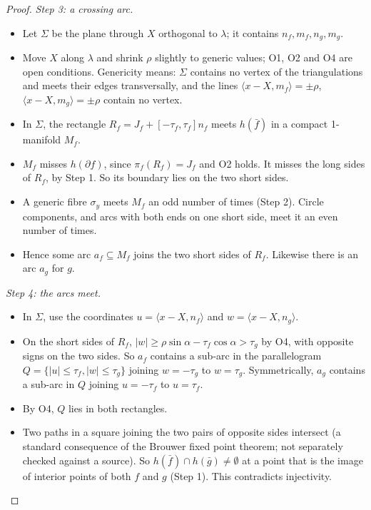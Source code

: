 \documentclass[preprint,12pt]{elsarticle}
\theoremstyle{definition}
\theoremstyle{remark}
\begin{document}
\begin{proof}
\emph{Step 3: a crossing arc.}
\begin{itemize}
\item Let $\Sigma$ be the plane through $X$ orthogonal to $\lambda$; it contains $n_f,m_f,n_g,m_g$.
\item Move $X$ along $\lambda$ and shrink $\rho$ slightly to generic values; O1, O2 and O4 are open conditions.
Genericity means: $\Sigma$ contains no vertex of the triangulations and meets their edges transversally, and the
lines $\langle x-X,m_f\rangle=\pm\rho$, $\langle x-X,m_g\rangle=\pm\rho$ contain no vertex.
\item In $\Sigma$, the rectangle $R_f=J_f+[-\tau_f,\tau_f]n_f$ meets $h(\bar f)$ in a compact 1-manifold $M_f$.
\item $M_f$ misses $h(\partial f)$, since $\pi_f(R_f)=J_f$ and O2 holds. It misses the long sides of $R_f$, by
Step 1. So its boundary lies on the two short sides.
\item A generic fibre $\sigma_y$ meets $M_f$ an odd number of times (Step 2). Circle components, and arcs with both
ends on one short side, meet it an even number of times.
\item Hence some arc $a_f\subseteq M_f$ joins the two short sides of $R_f$. Likewise there is an arc $a_g$ for $g$.
\end{itemize}

\emph{Step 4: the arcs meet.}
\begin{itemize}
\item In $\Sigma$, use the coordinates $u=\langle x-X,n_f\rangle$ and $w=\langle x-X,n_g\rangle$.
\item On the short sides of $R_f$, $|w|\ge\rho\sin\alpha-\tau_f\cos\alpha>\tau_g$ by O4, with opposite signs on
the two sides. So $a_f$ contains a sub-arc in the parallelogram $Q=\{|u|\le\tau_f,|w|\le\tau_g\}$ joining
$w=-\tau_g$ to $w=\tau_g$. Symmetrically, $a_g$ contains a sub-arc in $Q$ joining $u=-\tau_f$ to $u=\tau_f$.
\item By O4, $Q$ lies in both rectangles.
\item Two paths in a square joining the two pairs of opposite sides intersect (a standard consequence of the Brouwer
fixed point theorem; not separately checked against a source). So $h(\bar f)\cap h(\bar g)\ne\emptyset$ at a point that is
the image of interior points of both $f$ and $g$ (Step 1). This contradicts injectivity.
\end{itemize}
\end{proof}
\end{document}
